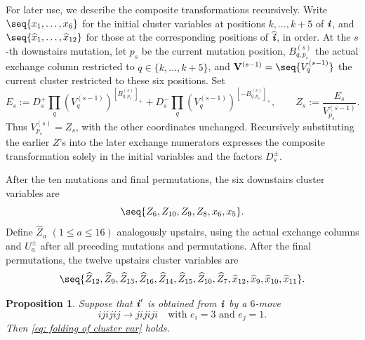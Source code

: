 \documentclass[12pt, leqno]{amsart}
\numberwithin{equation}{section}
\theoremstyle{plain}
\newtheorem{proposition}[lemma]{Proposition}
\theoremstyle{definition}
\renewcommand{\le}{\leqslant}
\newcommand{\seteq}{\mathbin{:=}}
\newcommand{\ii}{ \textbf{\textit{i}}}
\newcommand{\hZ}{\widehat{Z}}
\newcommand{\hx}{\widehat{x}}
\newcommand{\hii}{{\widehat{\ii}}}
\newcommand{\bfV}{\mathbf{V}}
\begin{document}
For later use, we describe the composite transformations recursively.
 Write $\seq{x_1,\ldots,x_6}$ for the initial cluster variables at
positions $k,\ldots,k+5$ of $\ii$, and
$\seq{\hx_1,\ldots,\hx_{12}}$ for those at the corresponding positions
of $\hii$, in order. 
At the $s$-th downstairs mutation, let $p_s$ be the current mutation
position, $B^{(s)}_{q,p_s}$ the actual exchange column restricted to
$q\in\{k,\ldots,k+5\}$, and
$\bfV^{(s-1)}=\seq{V_q^{(s-1)}}$ the current cluster restricted to these six positions. 
Set
\[
E_s\seteq D_s^+\prod_q(V_q^{(s-1)})^{[B^{(s)}_{q,p_s}]_+} + D_s^-\prod_q(V_q^{(s-1)})^{[-B^{(s)}_{q,p_s}]_+},
\qquad
Z_s\seteq\frac{E_s}{V_{p_s}^{(s-1)}}.
\]
Thus $V_{p_s}^{(s)}=Z_s$, with the other coordinates unchanged.
Recursively substituting the earlier $Z$'s into the later exchange
numerators expresses the composite transformation solely in the
initial variables and the factors $D_s^\pm$. \par
After the ten mutations and final permutations,  the six downstairs cluster variables are
\[
\seq{Z_6,Z_{10},Z_9,Z_8,x_6,x_5}.
\]
Define $\hZ_a$ $(1\le a\le16)$ analogously upstairs, using the actual
exchange columns and $U_a^\pm$ after all preceding mutations and
permutations.  After the final permutations, the twelve upstairs cluster variables are
\[
\seq{\hZ_{12},\hZ_9,\hZ_{13},\hZ_{16},\hZ_{14},\hZ_{15},
\hZ_{10},\hZ_7,\hx_{12},\hx_9,\hx_{10},\hx_{11}}.
\]

\begin{proposition}\label{prop: cluster folding six move 31}
Suppose that $\ii'$ is obtained from $\ii$ by a $6$-move
\[
ijijij\longrightarrow jijiji \quad \text{with $e_i=3$ and $e_j=1$.}
\]
Then
\eqref{eq: folding of cluster var} holds.
\end{proposition}
\end{document}
